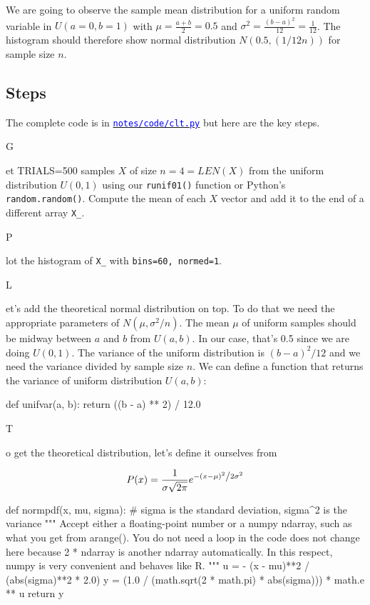 \documentclass[titlepage]{tufte-book}
\newcounter{problem}
\newcommand{\step}[1]{{}
\vspace{4pt} \noindent {\bf \theproblem. }#1\addtocounter{problem}{1}}
\begin{document}
\begin{fullwidth}
\noindent We are going to observe the sample mean distribution for a uniform random variable in $U(a=0,b=1)$ with $\mu=\frac{a+b}{2}=0.5$ and $\sigma^2 = \frac{(b-a)^2}{12}=\frac{1}{12}$.  The histogram should therefore show normal distribution $N(0.5,(1/12n))$ for sample size $n$.


\subsection{Steps}

The complete code is in \href{https://github.com/parrt/msan501/blob/master/notes/code/clt.py}{\textcolor{blue}{\tt notes/code/clt.py}} but here are the key steps.

\step Get TRIALS=500 samples $X$ of size $n=4=LEN(X)$ from the uniform distribution $U(0,1)$ using our {\tt runif01()} function or Python's {\tt random.random()}.  Compute the mean of each $X$ vector and add it to the end of a different array {\tt X\_}.

\step Plot the histogram of {\tt X\_} with {\tt bins=60, normed=1}.  

\step Let's add the theoretical normal distribution on top. To do that we need the appropriate parameters of $N(\mu, \sigma^2/n)$. The mean  $\mu$ of uniform samples should be midway between $a$ and $b$ from $U(a,b)$. In our case, that's 0.5 since we are doing $U(0,1)$. The variance of the uniform distribution is $(b-a)^2/12$ and we need the variance divided by sample size $n$.   We can define a function that returns the variance of uniform distribution $U(a,b)$:

\begin{pyverbatim}
def unifvar(a, b):
	return ((b - a) ** 2) / 12.0
\end{pyverbatim}

\step  To get the theoretical distribution, let's define it ourselves from

\[
P(x) = \frac{1}{{\sigma \sqrt {2\pi } }}e^{{{ - \left( {x - \mu } \right)^2 } \mathord{\left/ {\vphantom {{ - \left( {x - \mu } \right)^2 } {2\sigma ^2 }}} \right. \kern-\nulldelimiterspace} {2\sigma ^2 }}}
\]

\begin{pyverbatim}
def normpdf(x, mu, sigma): # sigma is the standard deviation, sigma^2 is the variance
    """
    Accept either a floating-point number or a numpy ndarray, such as what you get
    from arange().  You do not need a loop in the code does not change here
    because 2 * ndarray is another ndarray automatically. In this respect,
    numpy is very convenient and behaves like R.
    """
    u = - (x - mu)**2 / (abs(sigma)**2 * 2.0)
    y = (1.0 / (math.sqrt(2 * math.pi) * abs(sigma))) * math.e ** u
    return y
\end{pyverbatim}


\end{fullwidth}
\end{document}
